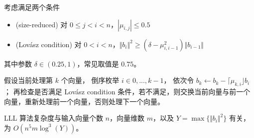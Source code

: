 \documentclass{ctexart}
\begin{document}
考虑满足两个条件
\begin{itemize}
    \item (size-reduced) 对 $0 \le j < i < n$，$|\mu_{i, j}| \le 0.5$
    \item (Lovász condition) 对 $0 < i < n$，${\Vert b_i \Vert} ^ 2 \ge (\delta - \mu_{i, i - 1}^2) {\Vert b_{i-1} \Vert}$
\end{itemize}

其中参数 $\delta \in (0.25, 1)$，常见取值是 $0.75$。

假设当前处理第 $k$ 个向量，
倒序枚举 $i\in{0, ..., k - 1}$，
依次令 $b_k \leftarrow b_k - \lceil \mu_{k, i} \rfloor b_i$；
再检查是否满足 Lovász condition 条件，若不满足，则交换当前向量与前一个向量，重新处理前一个向量，否则处理下一个向量。

LLL 算法复杂度与输入向量个数 $n$，向量维数 $m$，以及 $Y = \max\{{\Vert b_i \Vert} ^ 2\}$ 有关，
为 $O(n^5 m \log^3(Y))$。
\end{document}
